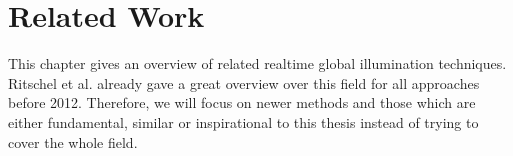 \documentclass[thesis.tex]{subfiles}
\begin{document}
\chapter{Related Work}
\label{chap:prevwork}


This chapter gives an overview of related realtime global illumination techniques.
Ritschel et al. \cite{bib:RealtimeGIOverview} already gave a great overview over this field for all approaches before 2012.
Therefore, we will focus on newer methods and those which are either fundamental, similar or inspirational to this thesis instead of trying to cover the whole field.
\end{document}
